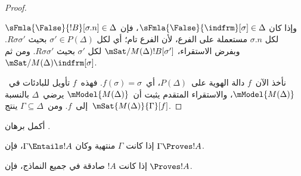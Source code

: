 \documentclass[../../../include/open-logic-section]{subfiles}
\begin{document}
\begin{proof}
\begin{enumerate}
{{      وإذا كان $\sFmla{\False}{\indfrm}[\sigma] \in \Delta$، فإن
      $\sFmla{\False}{!B}[\sigma.n] \in \Delta$ لكل $\sigma.n$
      مستعملة على الفرع، لأن الفرع تام؛ أي لكل $\sigma'
      \in P(\Delta)$ بحيث $R\sigma\sigma'$. وبفرض الاستقراء،
      $\mSat/{M(\Delta)}{!B}[\sigma']$ لكل $\sigma'$ بحيث
      $R\sigma\sigma'$. ومن ثم $\mSat/{M(\Delta)}{\indfrm}[\sigma]$.}}
\end{enumerate}
نأخذ الآن~$f$ دالة الهوية على~$P(\Delta)$، أي~$f(\sigma)=\sigma$.
فهذه~$f$ تأويل للبادئات في~$\mModel{M(\Delta)}$، والاستقراء المتقدم
يثبت أن~$\mModel{M(\Delta)}$ يرضي~$\Delta$ بالنسبة إلى~$f$.
ومن~$\Gamma \subseteq \Delta$ ينتج~$\mSat{M(\Delta)}{\Gamma}[f]$.
\end{proof}

\begin{prob}
أكمل برهان .
\end{prob}

\begin{cor}
إذا كانت $\Gamma$ منتهية وكان $\Gamma \Entails !A$، فإن
$\Gamma \Proves !A$.
\end{cor}

\begin{cor}
إذا كانت $!A$ صادقة في جميع النماذج، فإن $\Proves !A$.
\end{cor}
\end{document}
